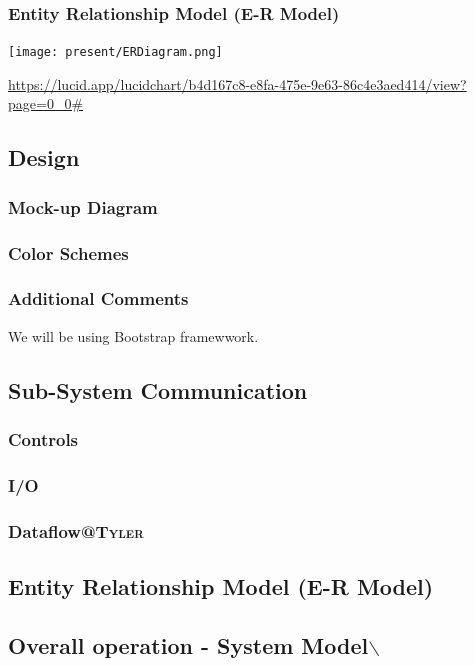 \documentclass[11pt]{article}
\begin{document}
\subsubsection{Entity Relationship Model (E-R Model)}
\label{sec:org17df613}
\begin{center}
\texttt{[image: present/ERDiagram.png]}
\end{center}
\url{https://lucid.app/lucidchart/b4d167c8-e8fa-475e-9e63-86c4e3aed414/view?page=0\_0\#}
\subsection{Design}
\label{sec:org48665f4}
\subsubsection{Mock-up Diagram}
\label{sec:org84465fd}
\subsubsection{Color Schemes}
\label{sec:orgd5754ee}
\subsubsection{Additional Comments}
\label{sec:org527642e}
We will be using Bootstrap framewwork.
\subsection{Sub-System Communication}
\label{sec:org789c6c4}
\subsubsection{Controls}
\label{sec:org1160952}
\subsubsection{I/O}
\label{sec:org8018958}
\subsubsection{Dataflow\hfill{}\textsc{@Tyler}}
\label{sec:org82fbf72}
\subsection{Entity Relationship Model (E-R Model)}
\label{sec:orgc629d54}
\subsection{Overall operation - System Model$\backslash$}
\label{sec:org791ce30}
\end{document}
